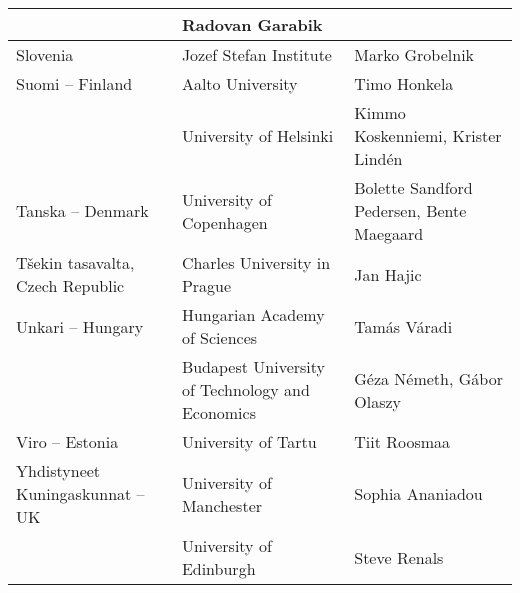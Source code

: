 \documentclass[]{../../metanetpaper}
\begin{document}
\begin{Parallel}[c]{77mm}{77mm}
\begin{longtable}{p{3.5cm}|p{5.5cm}|p{5cm}}
 &  Radovan Garabik
 \\ \hline
 Slovenia
 &  Jozef Stefan Institute
 &  Marko Grobelnik
 \\ \hline
 Suomi -- Finland
 & Aalto University
 & Timo Honkela
 \\
 & University of Helsinki
 & Kimmo Koskenniemi,
   Krister Lindén
 \\ \hline
 Tanska -- Denmark
 &  University of Copenhagen
 &  Bolette Sandford Pedersen,
    Bente Maegaard
 \\ \hline
 \raggedright
 Tšekin tasavalta, Czech Republic
 &  Charles University in Prague
 &  Jan Hajic
 \\ \hline
 Unkari -- Hungary
 &  Hungarian Academy of Sciences
 &  Tamás Váradi
 \\
 &  \raggedright Budapest University of            
    Technology and Economics
 &  Géza Németh,
    Gábor Olaszy
 \\ \hline
 Viro -- Estonia
 &  University of Tartu
 &  Tiit Roosmaa \\ \hline
 Yhdistyneet
 Kuningaskunnat -- UK
 &  University of Manchester
 &  Sophia Ananiadou \\
 &  University of Edinburgh
 &  Steve Renals
 \\ \hline
\end{longtable}


  \end{Parallel}
\end{document}
